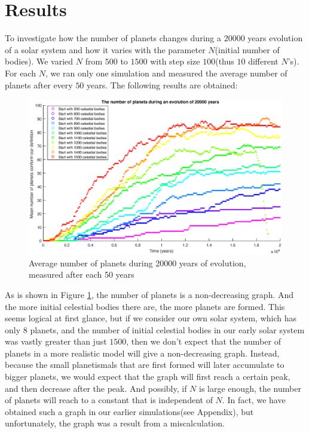 \section{Results}
To investigate how the number of planets changes during a $20000$ years evolution of a solar system and how it varies with the parameter $N$(initial number of bodies). 
We varied $N$ from $500$ to $1500$ with step size $100$(thus $10$ different $N$'s). 
For each $N$, we ran only one simulation and measured the average number of planets after every $50$ years. The following results are obtained:

\begin{figure}[H]
\centering
\hspace*{-3cm}
\includegraphics[scale=0.8]{AantPlanetenNieuw.eps}
\caption{Average number of planets during 20000 years of evolution, measured after each 50 years}
    \label{fig:AantPlanetenNieuw}
\end{figure}
As is shown in Figure \ref{fig:AantPlanetenNieuw}, the number of planets is a non-decreasing graph. And the more initial celestial bodies there are, the more planets are formed. This seems logical at first glance, but if we consider our own solar system, which has only 8 planets, and the number of initial celestial bodies in our early solar system was vastly greater than just $1500$, then we don't expect that the number of planets in a more realistic model will give a non-decreasing graph. Instead, because the small planetismals that are first formed will later accumulate to bigger planets, we would expect that the graph will first reach a certain peak, and then decrease after the peak. And possibly, if $N$ is large enough, the number of planets will reach to a constant that is independent of $N$. In fact, we have obtained such a graph in our earlier simulations(see Appendix), but unfortunately, the graph was a result from a miscalculation. \\

